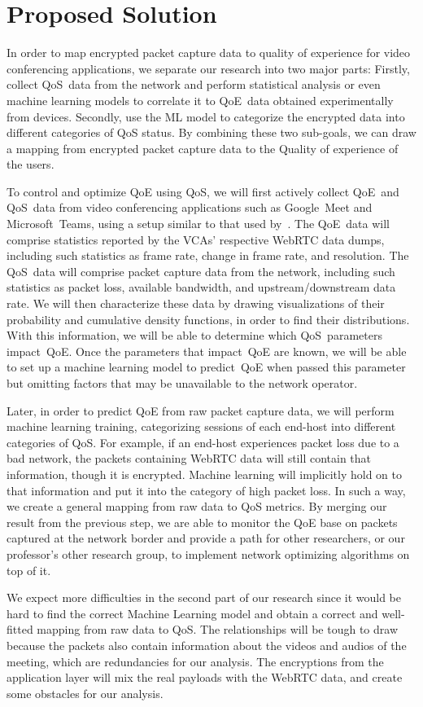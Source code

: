 \section{Proposed Solution}\label{proposed-solution}
    In order to map encrypted packet capture data to quality of experience for video conferencing applications, we separate our research into two major parts: Firstly, collect QoS~data from the network and perform statistical analysis or even machine learning models to correlate it to QoE~data obtained experimentally from devices. Secondly, use the ML model to categorize the encrypted data into different categories of QoS status. By combining these two sub-goals, we can draw a mapping from encrypted packet capture data to the Quality of experience of the users.

    To control and optimize QoE using QoS, we will first actively collect QoE~and QoS~data from video conferencing applications such as Google~Meet and Microsoft~Teams, using a setup similar to that used by~\textcite{MacMillanKyle2021MtPa}. The QoE~data will comprise statistics reported by the VCAs' respective WebRTC data dumps, including such statistics as frame rate, change in frame rate, and resolution. The QoS~data will comprise packet capture data from the network, including such statistics as packet loss, available bandwidth, and upstream/downstream data rate. We will then characterize these data by drawing visualizations of their probability and cumulative density functions, in order to find their distributions. With this information, we will be able to determine which QoS~parameters impact~QoE. Once the parameters that impact~QoE are known, we will be able to set up a machine learning model to predict~QoE when passed this parameter but omitting factors that may be unavailable to the network operator.

    Later, in order to predict QoE from raw packet capture data, we will perform machine learning training, categorizing sessions of each end-host into different categories of QoS. For example, if an end-host experiences packet loss due to a bad network, the packets containing WebRTC data will still contain that information, though it is encrypted. Machine learning will implicitly hold on to that information and put it into the category of high packet loss. In such a way, we create a general mapping from raw data to QoS metrics. By merging our result from the previous step, we are able to monitor the QoE base on packets captured at the network border and provide a path for other researchers, or our professor's other research group, to implement network optimizing algorithms on top of it.

    We expect more difficulties in the second part of our research since it would be hard to find the correct Machine Learning model and obtain a correct and well-fitted mapping from raw data to QoS. The relationships will be tough to draw because the packets also contain information about the videos and audios of the meeting, which are redundancies for our analysis. The encryptions from the application layer will mix the real payloads with the WebRTC data, and create some obstacles for our analysis.
